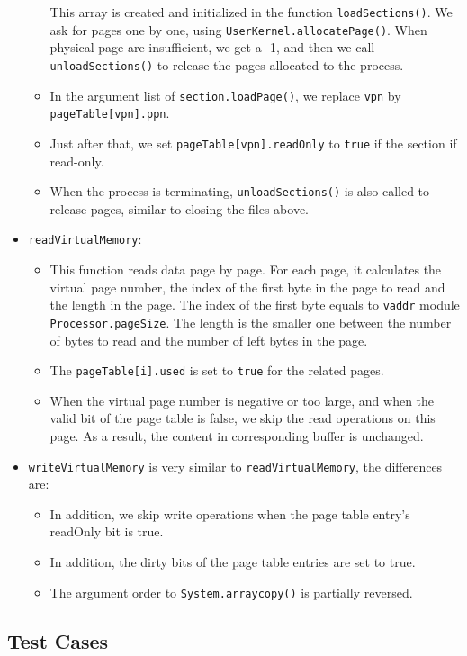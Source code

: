 \documentclass{article}
\begin{document}
\begin{itemize}
\begin{itemize}
	This array is created and initialized in the function \texttt{loadSections()}.
	We ask for pages one by one, using \texttt{UserKernel.allocatePage()}.
	When physical page are insufficient, we get a -1, and then we call \texttt{unloadSections()} to release the pages allocated to the process.
	\item
	In the argument list of \texttt{section.loadPage()}, we replace \texttt{vpn} by \texttt{pageTable[vpn].ppn}.
	\item
	Just after that, we set \texttt{pageTable[vpn].readOnly} to \texttt{true} if the section if read-only.
	\item
	When the process is terminating, \texttt{unloadSections()} is also called to release pages, similar to closing the files above.
	\end{itemize}
\item
\texttt{readVirtualMemory}:
	\begin{itemize}
	\item
	This function reads data page by page.
	For each page, it calculates the virtual page number, the index of the first byte in the page to read and the length in the page.
	The index of the first byte equals to \texttt{vaddr} module \texttt{Processor.pageSize}.
	The length is the smaller one between the number of bytes to read and the number of left bytes in the page.
	\item
	The \texttt{pageTable[i].used} is set to \texttt{true} for the related pages.
	\item
	When the virtual page number is negative or too large, and when the valid bit of the page table is false, we skip the read operations on this page.
	As a result, the content in corresponding buffer is unchanged.
	\end{itemize}
\item
\texttt{writeVirtualMemory} is very similar to \texttt{readVirtualMemory}, the differences are:
	\begin{itemize}
	\item
	In addition, we skip write operations when the page table entry's readOnly bit is true.
	\item
	In addition, the dirty bits of the page table entries are set to true.
	\item
	The argument order to \texttt{System.arraycopy()} is partially reversed.
	\end{itemize}
\end{itemize}

\subsection{Test Cases}
\end{document}
